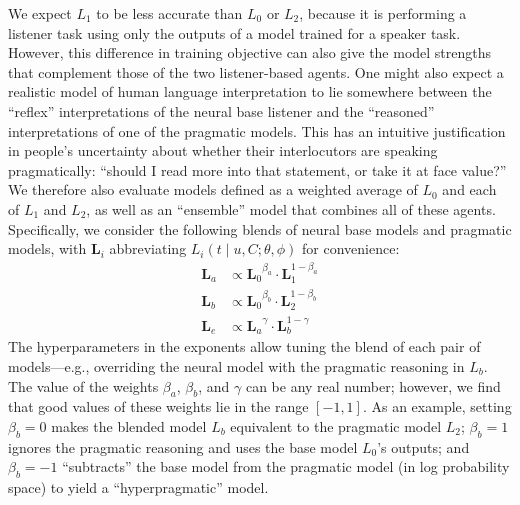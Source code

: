 \documentclass[11pt,letterpaper]{article}
\newcommand{\Listener}{L}
\newcommand{\utt}{u}
\newcommand{\context}{C}
\newcommand{\target}{t}
\renewcommand{\|}{\mid}
\begin{document}
We expect $\Listener_1$ to be less accurate than  $\Listener_0$ or
$\Listener_2$, because it is performing
a listener task using only the outputs of a model trained for a speaker task.
However, this difference in training objective can also give the model
strengths that complement those of the two listener-based agents.
One might also expect a realistic model of human language interpretation
to lie somewhere between the ``reflex'' interpretations of the neural base listener and the ``reasoned'' interpretations of
one of the pragmatic models. This has an intuitive justification in people's
uncertainty about whether their interlocutors are speaking pragmatically:
``should I read more into that statement, or take it at face value?''
We therefore also evaluate models defined as
a weighted average of $\Listener_0$ and each of $\Listener_1$ and $\Listener_2$,
as well as an ``ensemble'' model that combines all of these agents.
Specifically, we consider the following blends of neural base models and
pragmatic models, with $\mathbf{L}_{i}$ abbreviating
$\Listener_i(\target \| \utt, \context; \theta, \phi)$ for convenience:
\begin{align}
\mathbf{L}_a &\propto {\mathbf{L}_0}^{\beta_a} \cdot
\mathbf{L}_1^{1-\beta_a}  \label{eq:beta_a} \\
\mathbf{L}_b &\propto {\mathbf{L}_0}^{\beta_b} \cdot
\mathbf{L}_2^{1-\beta_b}  \label{eq:beta_b} \\
\mathbf{L}_e &\propto {\mathbf{L}_a}^{\gamma} \cdot
\mathbf{L}_b^{1-\gamma}  \label{eq:gamma}
\end{align}
%
%
The hyperparameters in the exponents allow tuning the
blend of each pair of models---e.g., overriding the neural model with the pragmatic
reasoning in $\Listener_b$. The value of the weights
$\beta_a$, $\beta_b$, and $\gamma$ can be any real number; however, we find that
good values of these weights
lie in the range $[-1, 1]$. As an example, setting $\beta_b = 0$ makes the
blended model $\Listener_b$ equivalent to the pragmatic model $\Listener_2$;
$\beta_b = 1$ ignores the pragmatic reasoning and uses the base model
$\Listener_0$'s outputs; and $\beta_b = -1$
``subtracts'' the base model from the pragmatic model (in log probability space)
to yield a ``hyperpragmatic'' model.
\end{document}
